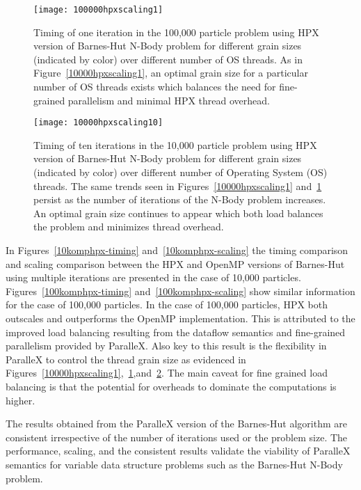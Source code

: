\documentclass[floatfix]{revtex4}
\begin{document}
 \begin{figure}[htp]
\centering
\texttt{[image: 100000hpxscaling1]}
\caption{Timing of one iteration in the 100,000 particle problem using HPX version of Barnes-Hut N-Body problem
for different grain sizes (indicated by color) over different number of OS threads.
As in Figure~\ref{10000hpxscaling1}, an optimal grain size for a particular number of OS threads exists which
balances the need for fine-grained parallelism and minimal HPX thread overhead.}
\label{100000hpxscaling1}
\end{figure}

 \begin{figure}[htp]
\centering
\texttt{[image: 10000hpxscaling10]}
\caption{Timing of ten iterations in the 10,000 particle problem using HPX version of Barnes-Hut N-Body problem
for different grain sizes (indicated by color) over different number of Operating System (OS) threads.
The same trends seen in Figures~\ref{10000hpxscaling1} and~\ref{100000hpxscaling1} persist as the 
number of iterations of the
N-Body problem increases. An optimal grain size continues to appear which both load balances the problem and 
minimizes thread overhead.}
\label{10000hpxscaling10}
\end{figure}

In Figures~\ref{10komphpx-timing} and~\ref{10komphpx-scaling} the timing comparison 
and scaling comparison between the HPX and
OpenMP versions of Barnes-Hut using multiple iterations are presented in the case of 10,000 particles. 
Figures~\ref{100komphpx-timing} and~\ref{100komphpx-scaling} show similar information for the case of 100,000 particles.
In the case of 100,000 particles, HPX both outscales and outperforms the OpenMP implementation. This is attributed to the improved
load balancing resulting from the dataflow semantics and fine-grained parallelism provided by ParalleX. Also key 
to this result is the flexibility in ParalleX to control the thread grain size as evidenced in  
Figures~\ref{10000hpxscaling1},~\ref{100000hpxscaling1},and~\ref{10000hpxscaling10}. The main caveat for
fine grained load balancing is that the potential for overheads to dominate the computations is higher.

The results obtained from the ParalleX version of the Barnes-Hut algorithm are consistent irrespective of
the number of iterations used or the problem size. The performance, scaling, and the consistent results validate
the viability of ParalleX semantics for variable data structure problems such as the Barnes-Hut N-Body problem.
\end{document}
